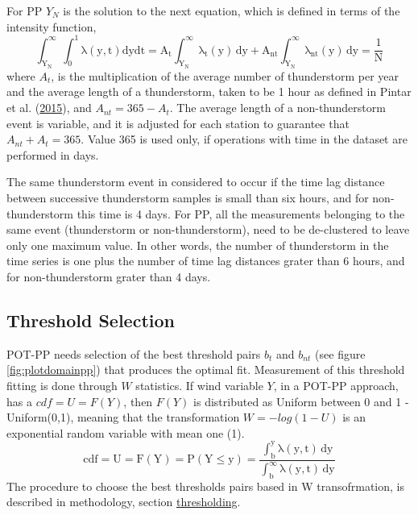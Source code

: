 \documentclass[12pt,oneside]{reedthesis}
\begin{document}
For PP \(Y_N\) is the solution to the next equation, which is defined in terms of the intensity function,
\begin{equation}
  \mathrm{
          \int_{Y_N}^{\infty}\int_0^1\lambda\left( y,t\right)dydt = A_t\int_{Y_N}^{\infty}\lambda_t\left( y\right)\,dy + A_{nt}\int_{Y_N}^{\infty}\lambda_{nt}\left( y\right)\,dy = \frac{1}{N}
         }
  \label{eq:pprl}
\end{equation}
where \(A_t\), is the multiplication of the average number of thunderstorm per year and the average length of a thunderstorm, taken to be 1 hour as defined in Pintar et al. (\protect\hyperlink{ref-Pintar2015}{2015}), and \(A_{nt} = 365 - A_t\). The average length of a non-thunderstorm event is variable, and it is adjusted for each station to guarantee that \(A_{nt} + A_t = 365\). Value 365 is used only, if operations with time in the dataset are performed in days.

The same thunderstorm event in considered to occur if the time lag distance between successive thunderstorm samples is small than six hours, and for non-thunderstorm this time is 4 days. For PP, all the measurements belonging to the same event (thunderstorm or non-thunderstorm), need to be de-clustered to leave only one maximum value. In other words, the number of thunderstorm in the time series is one plus the number of time lag distances grater than 6 hours, and for non-thunderstorm grater than 4 days.

\hypertarget{thresholdselection}{%
\subsection{Threshold Selection}\label{thresholdselection}}

POT-PP needs selection of the best threshold pairs \(b_t\) and \(b_{nt}\) (see figure \ref{fig:plotdomainpp}) that produces the optimal fit. Measurement of this threshold fitting is done through \(W\) statistics. If wind variable \(Y\), in a POT-PP approach, has a \(cdf = U = F(Y)\), then \(F(Y)\) is distributed as Uniform between 0 and 1 - Uniform(0,1), meaning that the transformation \(W = -log(1-U)\) is an exponential random variable with mean one (1).
\begin{equation}
  \mathrm{
            cdf = U= F(Y) = P(Y \leq y) = \frac{\int_b^y\lambda(y,t)\,dy}{\int_b^\infty\lambda(y,t)\,dy} 
         }
  \label{eq:ppcdf}
\end{equation}
The procedure to choose the best thresholds pairs based in W transofrmation, is described in methodology, section \protect\hyperlink{thresholding}{thresholding}.
\end{document}

